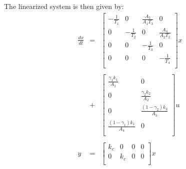 The linearized system is then given by:
\begin{equation}
    \boxed{
    \begin{array}{rcl}
        \frac{dx}{dt} & =  &  
        \left[
            \begin{array}{cccc}
                -\frac{1}{T_1} & 0 & \frac{A_3}{A_1 T_3} & 0 \\
                0 & -\frac{1}{T_2} & 0 & \frac{A_4}{A_2 T_2} \\
                0 & 0 & -\frac{1}{T_3} & 0 \\
                0 & 0 & 0 & -\frac{1}{T_4} \\
            \end{array}
        \right] x  \\ 
        & & \\
        & + & \left[ 
            \begin{array}{cc}
                \frac{\gamma_1k_1}{A_1} & 0 \\
                0 & \frac{\gamma_2k_2}{A_2} \\
                0 & \frac{(1-\gamma_2)k_2}{A_3} \\
                \frac{(1-\gamma_1)k_1}{A_4} & 0 \\
            \end{array}
        \right] u 
        \\
        & & \\
        y & = & 
        \left[
            \begin{array}{cccc}
                k_c & 0 & 0 & 0 \\
                0 & k_c & 0 & 0 \\
            \end{array}
        \right] x 
        \\
    \end{array}
    \label{linearizedsyseq}
}
\end{equation}

